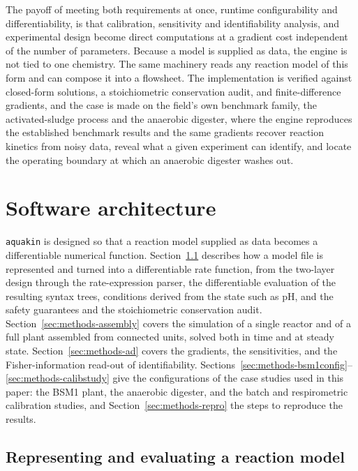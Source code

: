 \documentclass{article}
\begin{document}
The payoff of meeting both requirements at once, runtime configurability and differentiability, is that calibration, sensitivity and identifiability analysis, and experimental design become direct computations at a gradient cost independent of the number of parameters. Because a model is supplied as data, the engine is not tied to one chemistry. The same machinery reads any reaction model of this form and can compose it into a flowsheet. The implementation is verified against closed-form solutions, a stoichiometric conservation audit, and finite-difference gradients, and the case is made on the field's own benchmark family, the activated-sludge process and the anaerobic digester, where the engine reproduces the established benchmark results and the same gradients recover reaction kinetics from noisy data, reveal what a given experiment can identify, and locate the operating boundary at which an anaerobic digester washes out.

\section{Software architecture}
\label{sec:methods}

\texttt{aquakin} is designed so that a reaction model supplied as data becomes a differentiable numerical function. Section~\ref{sec:methods-model} describes how a model file is represented and turned into a differentiable rate function, from the two-layer design through the rate-expression parser, the differentiable evaluation of the resulting syntax trees, conditions derived from the state such as pH, and the safety guarantees and the stoichiometric conservation audit. Section~\ref{sec:methods-assembly} covers the simulation of a single reactor and of a full plant assembled from connected units, solved both in time and at steady state. Section~\ref{sec:methods-ad} covers the gradients, the sensitivities, and the Fisher-information read-out of identifiability. Sections~\ref{sec:methods-bsm1config}--\ref{sec:methods-calibstudy} give the configurations of the case studies used in this paper: the BSM1 plant, the anaerobic digester, and the batch and respirometric calibration studies, and Section~\ref{sec:methods-repro} the steps to reproduce the results.

\subsection{Representing and evaluating a reaction model}
\label{sec:methods-model}
\end{document}

